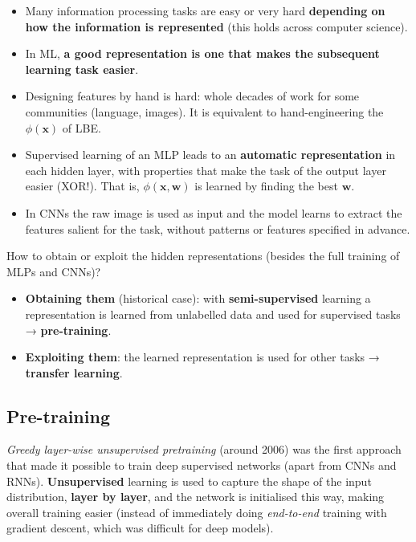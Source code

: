 \begin{itemize}
\tightlist
\item
  Many information processing tasks are easy or very hard
  \textbf{depending on how the information is represented} (this holds
  across computer science).
\item
  In ML, \textbf{a good representation is one that makes the subsequent
  learning task easier}.
\item
  Designing features by hand is hard: whole decades of work for some
  communities (language, images). It is equivalent to hand-engineering
  the \(\phi(\mathbf{x})\) of LBE.
\item
  Supervised learning of an MLP leads to an \textbf{automatic
  representation} in each hidden layer, with properties that make the
  task of the output layer easier (XOR!). That is,
  \(\phi(\mathbf{x}, \mathbf{w})\) is learned by finding the best
  \(\mathbf{w}\).
\item
  In CNNs the raw image is used as input and the model learns to
  extract the features salient for the task, without patterns or
  features specified in advance.
\end{itemize}

How to obtain or exploit the hidden representations (besides the full
training of MLPs and CNNs)?

\begin{itemize}
\tightlist
\item
  \textbf{Obtaining them} (historical case): with
  \textbf{semi-supervised} learning a representation is learned from
  unlabelled data and used for supervised tasks →
  \textbf{pre-training}.
\item
  \textbf{Exploiting them}: the learned representation is used for
  other tasks → \textbf{transfer learning}.
\end{itemize}

\subsection{Pre-training}\label{pre-training}

\emph{Greedy layer-wise unsupervised pretraining} (around 2006) was the
first approach that made it possible to train deep supervised networks
(apart from CNNs and RNNs). \textbf{Unsupervised} learning is used to
capture the shape of the input distribution, \textbf{layer by layer},
and the network is initialised this way, making overall training easier
(instead of immediately doing \emph{end-to-end} training with gradient
descent, which was difficult for deep models).

